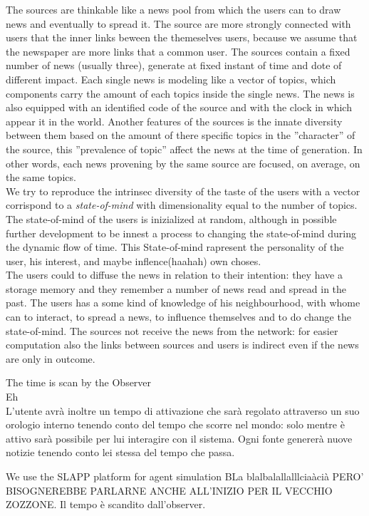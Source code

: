 \documentclass[11pt]{article} %
\begin{document}
The sources are thinkable like a news pool from which the users can to draw news and eventually to spread it. The source are more strongly connected with users that the inner links beween the themeselves users, because we assume that the newspaper are more links that a common user.
The sources contain a fixed number of news (usually three), generate at fixed instant of time and dote of different impact. Each single news is modeling like a vector of topics, which components carry the amount of each topics inside the single news. The news is also equipped with an identified code of the source and with the clock in which appear it in the world. 
Another features of the sources is the innate diversity between them based on the amount of there specific topics in the ''character'' of the source, this ''prevalence of topic'' affect the news at the time of generation. In other words, each news provening by the same source are focused, on average, on the same topics. \\
We try to reproduce the intrinsec diversity of the taste of the users with a vector corrispond to a {\itshape state-of-mind} with dimensionality equal to the number of topics. The state-of-mind of the users is inizialized at random, although in possible further development to be innest a process to changing the state-of-mind during the dynamic flow of time. This State-of-mind rapresent the personality of the user, his interest, and maybe inflence(haahah) own choses.
\\
The users could to diffuse the news in relation to their intention: they have a storage memory and they remember a number of news read and spread in the past.
The users has a some kind of knowledge of his neighbourhood, with whome can to interact, to spread a news, to influence themselves and to do change the state-of-mind. The sources not receive the news from the network: for easier computation also the links between sources and users is indirect even if the news are only in outcome.

The time is scan by the Observer\\
Eh
\\
L’utente avrà inoltre un tempo di attivazione che sarà regolato attraverso un suo orologio interno
tenendo conto del tempo che scorre nel mondo: solo mentre è attivo sarà possibile per lui interagire
con il sistema. 
Ogni fonte genererà nuove notizie tenendo conto lei stessa del
tempo che passa.

We use the SLAPP platform for agent simulation BLa blalbalallalllciaàcià PERO' BISOGNEREBBE PARLARNE ANCHE ALL'INIZIO PER IL VECCHIO ZOZZONE.
Il tempo è scandito dall’observer. 
\end{document}

